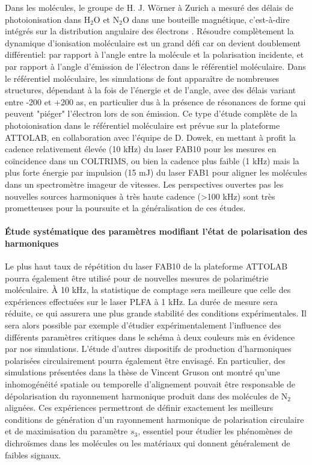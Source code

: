 Dans les molécules, le groupe de H. J. Wörner à Zurich a mesuré des délais de photoionisation dans H$_2$O et N$_2$O dans une bouteille magnétique, c'est-à-dire intégrés sur la distribution angulaire des électrons . Résoudre complètement la dynamique d'ionisation moléculaire est un grand défi car on devient doublement différentiel: par rapport à l'angle entre la molécule et la polarisation incidente, et par rapport à l'angle d'émission de l'électron dans le référentiel moléculaire. Dans le référentiel moléculaire, les simulations de  font apparaître de nombreuses structures, dépendant à la fois de l'énergie et de l'angle, avec des délais variant entre -200 et +200 as, en particulier dus à la présence de résonances de forme qui peuvent "piéger" l'électron lors de son émission. Ce type d'étude complète de la photoionisation dans le référentiel moléculaire est prévue sur la plateforme ATTOLAB, en collaboration avec l'équipe de D. Dowek, en mettant à profit la cadence relativement élevée (10 kHz) du laser FAB10 pour les mesures en coïncidence dans un COLTRIMS, ou bien la cadence plus faible (1 kHz) mais la plus forte énergie par impulsion (15 mJ) du laser FAB1 pour aligner les molécules dans un spectromètre imageur de vitesses. Les perspectives ouvertes pas les nouvelles sources harmoniques à très haute cadence (>100 kHz) sont très prometteuses pour la poursuite et la généralisation de ces études.

\paragraph*{\'{E}tude systématique des paramètres modifiant l'état de polarisation des harmoniques} Le plus haut taux de répétition du laser FAB10 de la plateforme ATTOLAB pourra également être utilisé pour de nouvelles mesures de polarimétrie moléculaire. \`{A} 10 kHz, la statistique de comptage sera meilleure que celle des expériences effectuées sur le laser PLFA à 1 kHz. La durée de mesure sera réduite, ce qui assurera une plus grande stabilité des conditions expérimentales. Il sera alors possible par exemple d'étudier expérimentalement l'influence des différents paramètres critiques dans le schéma à deux couleurs mis en évidence par nos simulations. L'étude d'autres dispositifs de production d'harmoniques polarisées circulairement pourra également être envisagé. En particulier, des simulations présentées dans la thèse de Vincent Gruson  ont montré qu'une inhomogénéité spatiale ou temporelle d'alignement pouvait être responsable de dépolarisation du rayonnement harmonique produit dans des molécules de N$_2$ alignées. Ces expériences permettront de définir exactement les meilleurs conditions de génération d'un rayonnement harmonique de polarisation circulaire et de maximisation du paramètre $s_3$, essentiel pour étudier les phénomènes de dichroïsmes dans les molécules ou les matériaux qui donnent généralement de faibles signaux.

